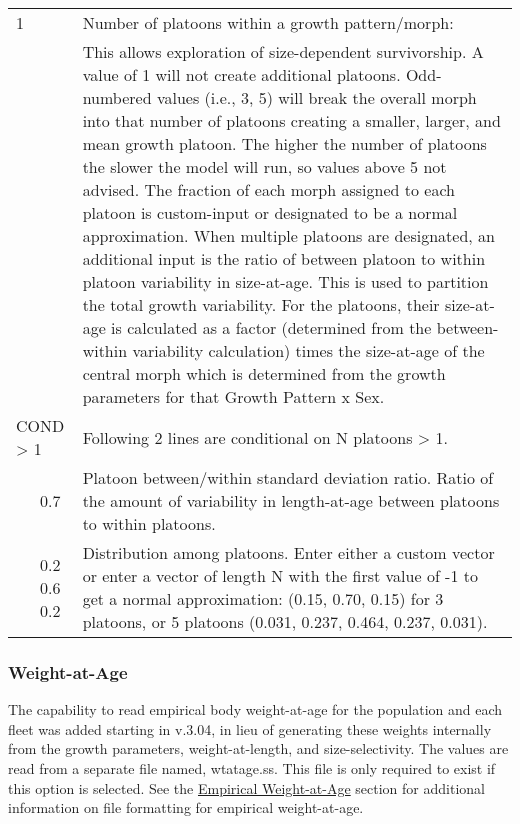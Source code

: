 \begin{center}
\begin{longtable}{p{0.5cm} p{2cm} p{12cm}}
		\hline
		1 & & Number of platoons within a growth pattern/morph:\Tstrut\\
		& & This allows exploration of size-dependent survivorship. A value of 1 will not create additional platoons.  Odd-numbered values (i.e., 3, 5) will break the overall morph into that number of platoons creating a smaller, larger, and mean growth platoon.  The higher the number of platoons the slower the model will run, so values above 5 not advised.  The fraction of each morph assigned to each platoon is custom-input or designated to be a normal approximation.  When multiple platoons are designated, an additional input is the ratio of between platoon to within platoon variability in size-at-age.  This is used to partition the total growth variability.  For the platoons, their size-at-age is calculated as a factor (determined from the between-within variability calculation) times the size-at-age of the central morph which is determined from the growth parameters for that Growth Pattern x Sex. \Bstrut\\

		\multicolumn{2}{l}{COND > 1}& \multicolumn{1}{l}{\parbox{12cm}{Following 2 lines are conditional on N platoons > 1.}} \Tstrut\Bstrut\\

		& 0.7 & Platoon between/within standard deviation ratio. Ratio of the amount of variability in length-at-age between platoons to within platoons.\Bstrut\\

		& 0.2 0.6 0.2 & Distribution among platoons. Enter either a custom vector or enter a vector of length N with the first value of -1 to get a normal approximation: (0.15, 0.70, 0.15) for 3 platoons, or 5 platoons (0.031, 0.237, 0.464, 0.237, 0.031).\Bstrut\\
		\hline
	\end{longtable}
\end{center}

\subsubsection{Weight-at-Age}
The capability to read empirical body weight-at-age for the population and each fleet was added starting in v.3.04, in lieu of generating these weights internally from the growth parameters, weight-at-length, and size-selectivity. The values are read from a separate file named, wtatage.ss. This file is only required to exist if this option is selected.  See the \hyperlink{WAA}{Empirical Weight-at-Age} section for additional information on file formatting for empirical weight-at-age.

